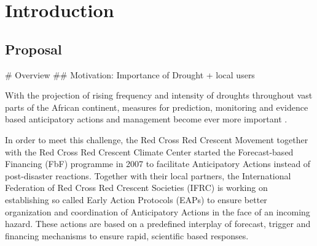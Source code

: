 
\chapter{Introduction} %

\label{Chapter1} %




\section{Proposal}
\# Overview
\#\# Motivation: Importance of Drought + local users

With the projection of rising frequency and intensity of droughts throughout vast parts of the African continent, measures for prediction, monitoring and evidence based anticipatory actions and management become ever more important \autocite{abdulkadirAssessmentDroughtRecurrence2017,adelekanAfricaClimateChange2022,vereintenationenSpecialReportDrought2021}.

In order to meet this challenge, the Red Cross Red Crescent Movement together with the Red Cross Red Crescent Climate Center started the Forecast-based Financing (FbF) programme in 2007 to facilitate Anticipatory Actions instead of post-disaster reactions. Together with their local partners, the International Federation of Red Cross Red Crescent Societies (IFRC) is working on establishing so called Early Action Protocols (EAPs) to ensure better organization and coordination of Anticipatory Actions in the face of an incoming hazard. These actions are based on a predefined interplay of forecast, trigger and financing mechanisms to ensure rapid, scientific based responses.

